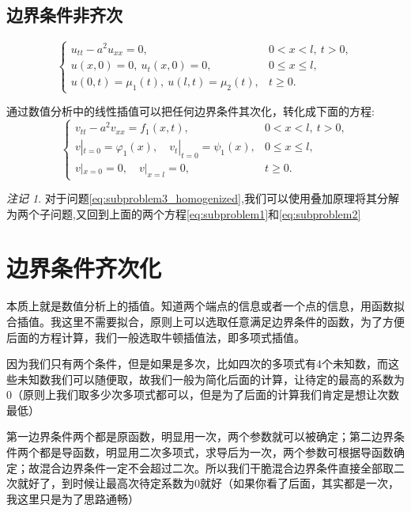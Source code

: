 \documentclass[a4paper, 12pt, oneside]{article} %
\numberwithin{subsection}{section}
\numberwithin{subsubsection}{subsection}
\theoremstyle{plain}
\theoremstyle{definition}
\theoremstyle{remark}
\newtheorem{remark}[theorem]{注记}
\begin{document}
		
		\subsection{边界条件非齐次}
		\begin{equation}\label{eq:subproblem3}
			\begin{cases}
				u_{tt} - a^2 u_{xx} = 0, & 0 < x < l, \ t > 0, \\
				u(x, 0) = 0, \ u_t(x, 0) = 0, & 0 \leq x \leq l, \\
				u(0, t) = \mu_1(t), \ u(l, t) = \mu_2(t), & t \geq 0.
			\end{cases}
		\end{equation}	
		
		通过数值分析中的线性插值可以把任何边界条件其次化，转化成下面的方程:
		\begin{equation}\label{eq:subproblem3_homogenized}
			\begin{cases}
				v_{tt} - a^2 v_{xx} = f_1(x, t), & 0 < x < l, \ t > 0, \\
				v|_{t=0} = \varphi_1(x), \quad v_t|_{t=0} = \psi_1(x), & 0 \leq x \leq l, \\
				v|_{x=0} = 0, \quad v|_{x=l} = 0, & t \geq 0.
			\end{cases}
		\end{equation}
		
		
		\begin{remark}
			对于问题\eqref{eq:subproblem3_homogenized},我们可以使用叠加原理将其分解为两个子问题,又回到上面的两个方程\eqref{eq:subproblem1}和\eqref{eq:subproblem2}
		\end{remark}
		
		
		
		
		\newpage
		
		\section{边界条件齐次化}
		本质上就是数值分析上的插值。知道两个端点的信息或者一个点的信息，用函数拟合插值。我这里不需要拟合，原则上可以选取任意满足边界条件的函数，为了方便后面的方程计算，我们一般选取牛顿插值法，即多项式插值。	
		
		因为我们只有两个条件，但是如果是多次，比如四次的多项式有4个未知数，而这些未知数我们可以随便取，故我们一般为简化后面的计算，让待定的最高的系数为0（原则上我们取多少次多项式都可以，但是为了后面的计算我们肯定是想让次数最低）
		
		第一边界条件两个都是原函数，明显用一次，两个参数就可以被确定；第二边界条件两个都是导函数，明显用二次多项式，求导后为一次，两个参数可根据导函数确定；故混合边界条件一定不会超过二次。所以我们干脆混合边界条件直接全部取二次就好了，到时候让最高次待定系数为0就好（如果你看了后面，其实都是一次，我这里只是为了思路通畅）
\end{document}
